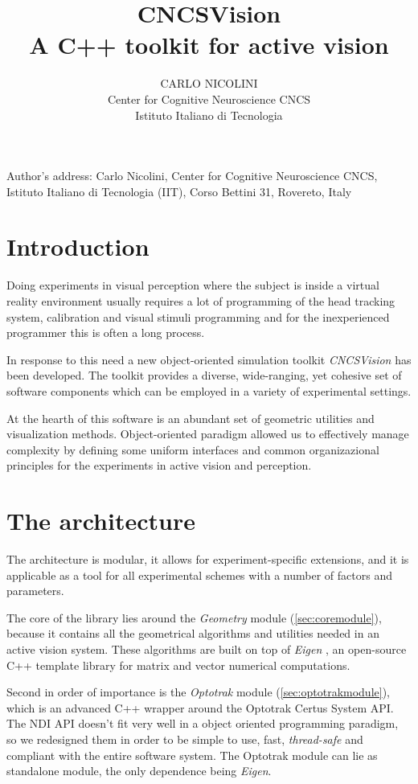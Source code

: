 \documentclass[acmtocl,acmnow]{acmtrans2m}
\title{\textbf{CNCSVision}\\A C++ toolkit for active vision}
\author{CARLO NICOLINI\\Center for Cognitive Neuroscience CNCS\\Istituto
Italiano di Tecnologia}
\begin{document}
\begin{bottomstuff}
Author's address: Carlo Nicolini, Center for Cognitive Neuroscience CNCS,
Istituto Italiano di Tecnologia (IIT),
Corso Bettini 31, Rovereto, Italy
\end{bottomstuff}

\maketitle

\section{Introduction}

Doing experiments in visual perception where the subject is inside a virtual reality environment usually requires a lot
of programming of the head tracking system, calibration and visual stimuli programming and for
the inexperienced programmer this is often a long process.

In response to this need a new object-oriented simulation toolkit
\textit{CNCSVision} has been developed. The toolkit provides a diverse,
wide-ranging, 
yet cohesive set of software components which can be employed in a variety of
experimental settings.

At the hearth of this software is an abundant set of geometric utilities and
visualization methods. Object-oriented paradigm allowed us to effectively
manage 
complexity by defining some uniform interfaces and common organizazional
principles for the experiments in active vision and perception. 

\section{The architecture}
The architecture is modular, it allows for experiment-specific extensions, and
it is
applicable as a tool for all experimental schemes with a number of factors and
parameters. 

The core of the library lies around the \emph{Geometry} module (\ref{sec:coremodule}), because it
contains all the geometrical algorithms and utilities needed in an active vision system. 
These algorithms are built on top of \textit{Eigen} \cite{eigenweb}, an open-source C++ template library
for matrix and vector numerical computations.

Second in order of importance is the \textit{Optotrak} module (\ref{sec:optotrakmodule}), which is an
advanced C++ wrapper around the Optotrak Certus System API.
The NDI API doesn't fit very well in a object oriented programming paradigm, so we
redesigned them in order to be simple to use, fast, \textit{thread-safe} and 
compliant with the entire software system. The Optotrak module can lie as
standalone module, the only dependence being \textit{Eigen}.
\end{document}
